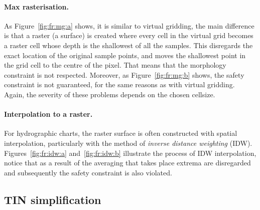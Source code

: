 %
\paragraph{Max rasterisation.}
As Figure~\ref{fig:fr:mg:a} shows, it is similar to virtual gridding, the main difference is that a raster (a surface) is created where every cell in the virtual grid becomes a raster cell whose depth is the shallowest of all the samples.
This disregards the exact location of the original sample points, and moves the shallowest point in the grid cell to the centre of the pixel. 
That means that the morphology constraint is not respected.
Moreover, as Figure~\ref{fig:fr:mg:b} shows, the safety constraint is not guaranteed, for the same reasons as with virtual gridding.
Again, the severity of these problems depends on the chosen cellsize.

%
\paragraph{Interpolation to a raster.}
For hydrographic charts, the raster surface is often constructed with spatial interpolation, particularly with the method of \emph{inverse distance weighting} (IDW).
Figures~\ref{fig:fr:idw:a} and~\ref{fig:fr:idw:b} illustrate the process of IDW interpolation, notice that as a result of the averaging that takes place extrema are disregarded and subsequently the safety constraint is also violated. 

%



\subsection{TIN simplification}
  
